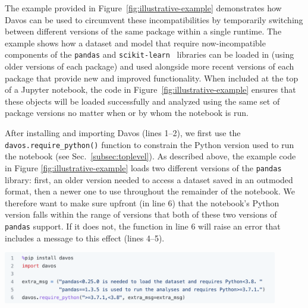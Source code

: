 \documentclass[preprint,12pt,a4paper]{elsarticle}
\begin{document}
The example provided in Figure~\ref{fig:illustrative-example} demonstrates how
Davos can be used to circumvent these incompatibilities by
temporarily switching between different versions of the same package within a single runtime.
The example shows how a dataset and model that require
now-incompatible components of the \texttt{pandas} and
\texttt{scikit-learn}~\cite{PedrEtal11} libraries can be loaded in (using older
versions of each package) and used alongside more recent versions of each
package that provide new and improved functionality. When included at the top
of a Jupyter notebook, the code in Figure~\ref{fig:illustrative-example}
ensures that these objects will be loaded successfully and analyzed using the
same set of package versions no matter when or by whom the notebook is run.

After installing and importing Davos (lines 1--2), we first use the \texttt{davos.require\_python()} function to constrain the Python version used to run the notebook (see Sec.~\ref{subsec:toplevel}).
As described above, the example code in Figure \ref{fig:illustrative-example} loads two different versions of the \texttt{pandas} library: first, an older version needed to access a dataset saved in an outmoded format, then a newer one to use throughout the remainder of the notebook.
We therefore want to make sure upfront (in line 6) that the notebook's Python version falls within the range of versions that both of these two versions of \texttt{pandas} support.
If it does not, the function in line 6 will raise an error that includes a message to this effect (lines 4--5).
\begin{center}
\includegraphics[width=0.9\textwidth]{figs/example1}
\end{center}
\end{document}

